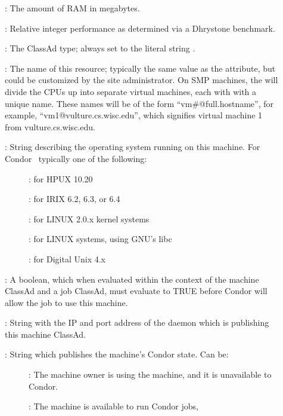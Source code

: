 \begin{description}
%
\item[] : The amount of RAM in megabytes.
%
\item[] : Relative integer performance as determined via a Dhrystone
benchmark.
%
\item[] : The ClassAd type; always set to the literal string .
%
\item[] : The name of this resource; typically the same value as
the  attribute, but could be customized by the site
administrator.
On SMP machines, the  will divide the CPUs up into separate
virtual machines, each with with a unique name.
These names will be of the form ``vm\#@full.hostname'', for example,
``vm1@vulture.cs.wisc.edu'', which signifies virtual machine 1 from
vulture.cs.wisc.edu. 
%
\item[] : String describing the operating system running on this
machine.  For Condor \VersionNotice\ typically one of the following:
	\begin{description}
	\item[] : for HPUX 10.20
	\item[]  : for IRIX 6.2, 6.3, or 6.4
	\item[]  : for LINUX 2.0.x kernel systems
	\item[]  : for LINUX systems, using GNU's libc
	\item[]  : for Digital Unix 4.x
	\item[]
	\item[]
	\end{description}
%
\item[] : A boolean, which when evaluated within the context
of the machine ClassAd and a job ClassAd, must evaluate to
TRUE before Condor will allow the job to use this machine.
%
\item[] : String with the IP and port address of the
 daemon which is publishing this machine ClassAd.
%
\item[] : String which publishes the machine's Condor state.
Can be:
	\begin{description}
	\item[] : The machine owner is using the machine, and
it is unavailable to Condor.
	\item[] : The machine is available to run Condor jobs,

\end{description}
\end{description}
